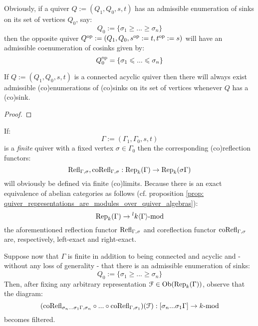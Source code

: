             \begin{remark}
                Obviously, if a quiver $Q := (Q_1, Q_0, s, t)$ has an admissible enumeration of sinks on its set of vertices $Q_0$, say:
                    $$Q_0 := \{\sigma_1 \geq ... \geq \sigma_n\}$$
                then the opposite quiver $Q^{\mathrm{op}} := (Q_1, Q_0, s^{\mathrm{op}} := t, t^{\mathrm{op}} := s)$ will have an admissible coenumeration of cosinks given by:
                    $$Q^{\mathrm{op}}_0 = \{\sigma_1 \leqslant ... \leqslant \sigma_n\}$$
            \end{remark}
            \begin{proposition} \label{prop: existence_of_admissible_enumerations}
                If $Q := (Q_1, Q_0, s, t)$ is a connected acyclic quiver then there will always exist admissible (co)enumerations of (co)sinks on its set of vertices whenever $Q$ has a (co)sink. 
            \end{proposition}
                \begin{proof}
                    
                \end{proof}
            \begin{remark} \label{remark: (co)reflection_functors_on_finite_connected_acyclic_quivers_are_exact}
                If:
                    $$\Gamma := (\Gamma_1, \Gamma_0, s, t)$$
                is a \textit{finite} quiver with a fixed vertex $\sigma \in \Gamma_0$ then the corresponding (co)reflection functors:
                    $$\mathrm{Refl}_{\Gamma, \sigma}, \mathrm{co}\mathrm{Refl}_{\Gamma, \sigma}: \mathrm{Rep}_k(\Gamma) \to \mathrm{Rep}_k(\sigma \Gamma)$$
                will obviously be defined via finite (co)limits. Because there is an exact equivalence of abelian categories as follows (cf. proposition \ref{prop: quiver_representations_are_modules_over_quiver_algebras}):
                    $$\mathrm{Rep}_k(\Gamma) \to {}^lk\langle\Gamma\rangle\text{-}\mathrm{mod}$$
                the aforementioned reflection functor $\mathrm{Refl}_{\Gamma, \sigma}$ and coreflection functor $\mathrm{co}\mathrm{Refl}_{\Gamma, \sigma}$ are, respectively, left-exact and right-exact.
                
                Suppose now that $\Gamma$ is finite in addition to being connected and acyclic and - without any loss of generality - that there is an admissible enumeration of sinks:
                    $$Q_0 := \{\sigma_1 \geq ... \geq \sigma_n\}$$
                Then, after fixing any arbitrary representation $\mathcal{F} \in \mathrm{Ob}(\mathrm{Rep}_k(\Gamma))$, observe that the diagram:
                    $$(\mathrm{co}\mathrm{Refl}_{\sigma_n ... \sigma_1 \Gamma, \sigma_n} \circ ... \circ \mathrm{co}\mathrm{Refl}_{\Gamma, \sigma_1})(\mathcal{F}): [\sigma_n ... \sigma_1 \Gamma] \to k\text{-}\mathrm{mod}$$
                becomes filtered. 
            \end{remark}
